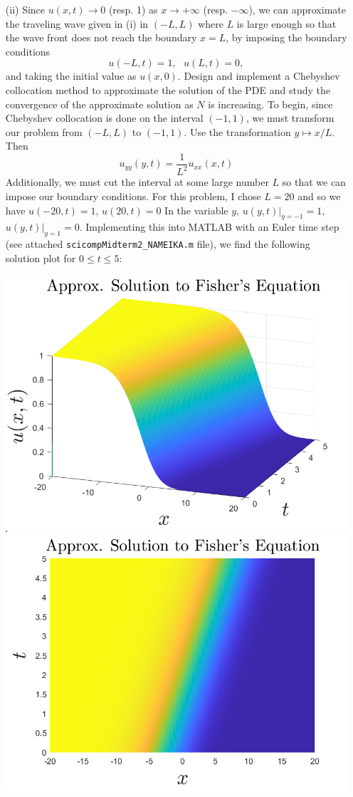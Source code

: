 \documentclass{article}
\begin{document}
\begin{itemize}
    \item[(ii)] Since $u(x,t) \to 0$ (resp. 1) as $x \to +\infty$ (resp. $-\infty$), we can approximate the traveling wave given in (i) in $(-L,L)$ where $L$ is large enough so that the wave front does not reach the boundary $x = L$, by imposing the boundary conditions
    \[u(-L,t) = 1, \:\:\: u(L,t) = 0,\]
    and taking the initial value as $u(x,0)$. Design and implement a Chebyshev collocation method to approximate the solution of the PDE and study the convergence of the approximate solution as $N$ is increasing.
    \newline\newline
    To begin, since Chebyshev collocation is done on the interval $(-1,1)$, we must transform our problem from $(-L,L)$ to $(-1,1)$. Use the transformation $y \mapsto x/L$. Then
    \[u_{yy}(y,t) = \frac{1}{L^2}u_{xx}(x,t)\]
    Additionally, we must cut the interval at some large number $L$ so that we can impose our boundary conditions. For this problem, I chose $L = 20$ and so we have $u(-20,t) = 1$, $u(20, t) = 0$ In the variable $y$, $u(y,t)|_{y=-1} = 1$, $u(y,t)|_{y=1} = 0$. Implementing this into MATLAB with an Euler time step (see attached \verb+scicompMidterm2_NAMEIKA.m+ file), we find the following solution plot for $0 \leq t \leq 5$:
    \begin{center}
        \includegraphics[scale = 0.3]{FishersEqSol}
        \includegraphics[scale = 0.3]{fishersTopDown}

\end{center}
\end{itemize}
\end{document}
